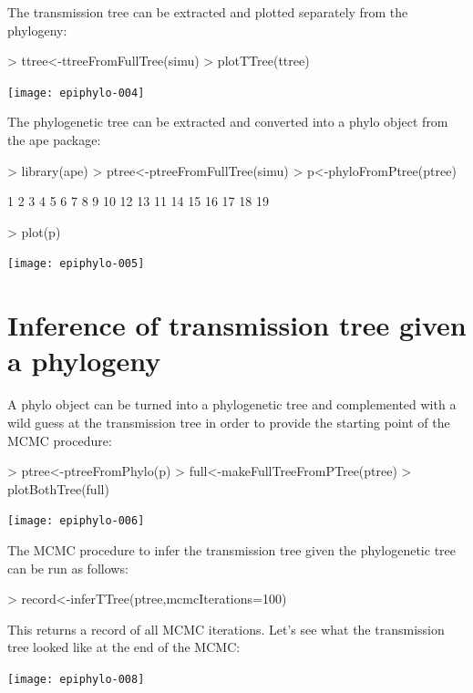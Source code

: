 \documentclass[a4paper]{article}
\begin{document}
The transmission tree can be extracted and plotted separately from the phylogeny:

\begin{Schunk}
\begin{Sinput}
> ttree<-ttreeFromFullTree(simu)
> plotTTree(ttree)
\end{Sinput}
\end{Schunk}
\texttt{[image: epiphylo-004]}

The phylogenetic tree can be extracted and converted into a phylo object from the ape package:

\begin{Schunk}
\begin{Sinput}
> library(ape)
> ptree<-ptreeFromFullTree(simu)
> p<-phyloFromPtree(ptree)
\end{Sinput}
\begin{Soutput}
 [1]  1  2  3  4  5  6  7  8  9 10 12 13 11 14 15 16 17 18 19
\end{Soutput}
\begin{Sinput}
> plot(p)
\end{Sinput}
\end{Schunk}
\texttt{[image: epiphylo-005]}

\section{Inference of transmission tree given a phylogeny}

A phylo object can be turned  into a phylogenetic tree and complemented with a wild guess at the transmission tree in order to provide the starting point of the MCMC procedure:

\begin{Schunk}
\begin{Sinput}
> ptree<-ptreeFromPhylo(p)
> full<-makeFullTreeFromPTree(ptree)
> plotBothTree(full)
\end{Sinput}
\end{Schunk}
\texttt{[image: epiphylo-006]}

The MCMC procedure to infer the transmission tree given the phylogenetic tree can be run as follows:

\begin{Schunk}
\begin{Sinput}
> record<-inferTTree(ptree,mcmcIterations=100)
\end{Sinput}
\end{Schunk}

This returns a record of all MCMC iterations. Let's see what the transmission tree looked like at the end of the MCMC:

\begin{Schunk}
\end{Schunk}
\texttt{[image: epiphylo-008]}
\end{document}
